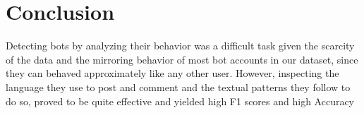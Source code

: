 \documentclass{article}
\begin{document}
 
 \section{Conclusion}
 Detecting bots by analyzing their behavior was a difficult task given the scarcity of the data and the mirroring behavior of most bot accounts in our dataset, since they can behaved approximately like any other user. However, inspecting the language they use to post and comment and the textual patterns they follow to do so, proved to be quite effective and yielded high F1 scores and high Accuracy
\end{document}
